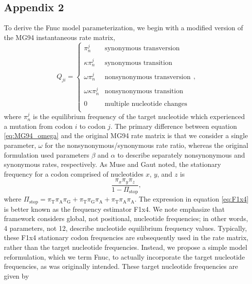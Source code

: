 \documentclass{pnastwo}
\begin{document}
\begin{article}
\bigskip



\section*{Appendix 2}
To derive the Fnuc model parameterization, we begin with a modified version of the MG94 \cite{MuseGaut1994} instantaneous rate matrix, 
\begin{equation}\label{eq:MG94_omega}
Q_{ji} = \left\{ 
\begin{array}{rl}
\pi_n^j                  &\mbox{synonymous transversion} \\\\
\kappa \pi_n^j           &\mbox{synonymous transition} \\\\
\omega \pi_n^j           &\mbox{nonsynonymous transversion} \\\\
\omega \kappa \pi_n^j    &\mbox{nonsynonymous transition} \\\\
0                        &\mbox{multiple nucleotide changes} \\           
\end{array} \right.,
\end{equation}
where $\pi_n^j$ is the equilibrium frequency of the target nucleotide which experienced a mutation from codon $i$ to codon $j$. The primary difference between equation \eqref{eq:MG94_omega} and the original MG94 rate matrix is that we consider a single parameter, $\omega$ for the nonsynonymous/synonymous rate ratio, whereas the original formulation used parameters $\beta$ and $\alpha$ to describe separately nonsynonymous and synonymous rates, respectively. As Muse and Gaut \cite{MuseGaut1994} noted, the stationary frequency for a codon comprised of nucleotides $x$, $y$, and $z$ is
\begin{equation}\label{eq:F1x4}
\frac{\pi_x\pi_y\pi_z}{1 - \Pi_\text{stop}}, 
\end{equation}
where $\Pi_\text{stop} = \pi_\text{T}\pi_\text{A}\pi_\text{G} + \pi_\text{T}\pi_\text{G}\pi_\text{A} + \pi_\text{T}\pi_\text{A}\pi_\text{A}$. The expression in equation \eqref{eq:F1x4} is better known as the frequency estimator F1x4. We note emphasize that framework considers global, not positional, nucleotide frequencies; in other words, 4 parameters, not 12, describe nucleotide equilibrium frequency values. Typically, these F1x4 stationary codon frequencies are subsequently used in the rate matrix, rather than the target nucleotide frequencies. Instead, we propose a simple model reformulation, which we term Fnuc, to actually incorporate the target nucleotide frequencies, as was originally intended. These target nucleotide frequencies are given by 

\end{article}
\end{document}
